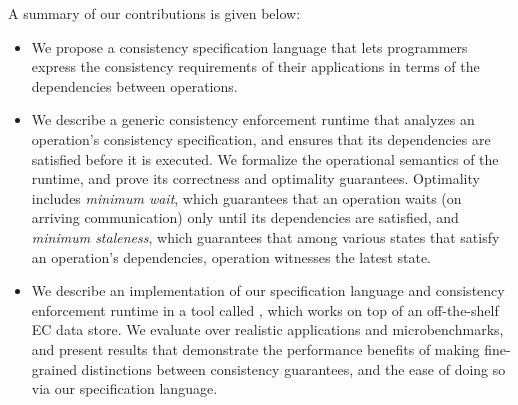 A summary of our contributions is given below:
\begin{itemize}
  \item We propose a consistency specification language that lets
    programmers express the consistency requirements of their
    applications in terms of the dependencies between operations.

  \item We describe a generic consistency enforcement runtime that
    analyzes an operation's consistency specification, and ensures
    that its dependencies are satisfied before it is executed. We
    formalize the operational semantics of the runtime, and prove its
    correctness and optimality guarantees. Optimality includes
    \emph{minimum wait}, which guarantees that an operation waits (on
    arriving communication) only until its dependencies are satisfied,
    and \emph{minimum staleness}, which guarantees that among various
    states that satisfy an operation's dependencies, operation
    witnesses the latest state.
  
  \item We describe an implementation of our specification language and
    consistency enforcement runtime in a tool called \tool, which
    works on top of an off-the-shelf EC data store. We evaluate \tool
    over realistic applications and microbenchmarks, and present
    results that demonstrate the performance benefits of making
    fine-grained distinctions between consistency guarantees, and the
    ease of doing so via our specification language.

\end{itemize}

